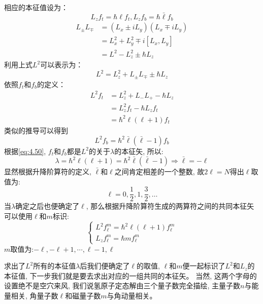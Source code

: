 \documentclass[a4paper,zihao=-4,linespread=1]{ctexrep}
\begin{document}
    相应的本征值设为：
    \[L_zf_t=\hbar \ell f_t,L_zf_b=\hbar \bar \ell f_b\]
    \begin{align*}
        L_\pm L_\mp&=\left(L_x\pm iL_y\right)\left(L_x\mp iL_y\right)\\
                   &=L_x^2+L_y^2\mp i\left[L_x,L_y\right]\\
                   &=L^2-L_z^2\pm \hbar L_z
    \end{align*}
    利用上式$L^2$可以表示为：
    \begin{equation}
        \label{eq:4.52}
        L^2=L_z^2+L_\pm L_\mp \pm \hbar L_z
    \end{equation}
    依照$f_t$和$f_b$的定义：
    \begin{align*}
        L^2f_t&=L_z^2+L_- L_+ - \hbar L_z\\
        &=L_z^2f_t-\hbar L_zf_t\\
        &=\hbar^2\ell\left(\ell+1\right)f_t
    \end{align*}
    类似的推导可以得到
    \[ L^2f_b=\hbar^2\bar \ell\left(\bar \ell-1\right)f_b\]
    根据\ref{eq:4.50}, $f_t$和$f_b$都是$L^2$的关于$\lambda$的本征矢, 所以:
    \[\lambda=\hbar^2\ell\left(\ell+1\right)=\hbar^2\bar \ell\left(\bar \ell-1\right)\Rightarrow\bar \ell=-\ell\]
    显然根据升降阶算符的定义, $\bar\ell $和$\ell$之间肯定相差的一个整数, 故$2\ell=N$得出$\ell $取值为:
    \[\ell=0,\frac{1}{2},1,\frac{3}{2},\ldots\]
    当$\lambda$确定之后也便确定了$\ell$, 那么根据升降阶算符生成的两算符之间的共同本征矢可以使用$\ell$和$m$标识:
    \begin{equation}
        \label{eq:4.53}
        \begin{cases}
            L^2f_\ell^m=\hbar^2\ell\left(\ell+1\right)f_\ell^m\\
            L_zf_\ell^m=\hbar m f_\ell^m
        \end{cases}
    \end{equation}
    $m$取值为:$-\ell,-\ell+1,\cdots,\ell-1,\ell$

    求出了$L^2$所有的本征值$\lambda$后我们便确定了$\ell$的取值, $\ell$和$m$便一起标识了$L^2$和$L_z$的本征值, 下一步我们就是要去求出对应的一组共同的本征矢。
    当然, 这两个字母的设置绝不是空穴来风, 我们说氢原子定态解由三个量子数完全描绘, 主量子数$n$与能量相关, 角量子数$\ell $和磁量子数$m$与角动量相关。
\end{document}
